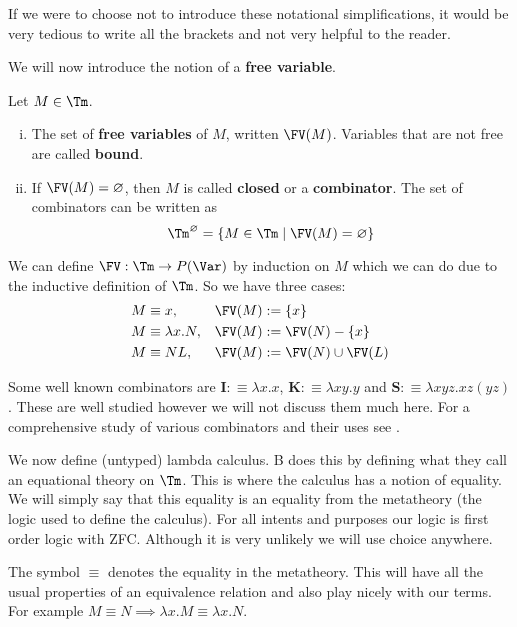 If we were to choose not to introduce these notational simplifications, it would be very tedious to write all the brackets and not very helpful to the reader.

We will now introduce the notion of a {\bf free variable}.

\begin{defin}
    Let $M \in \Tm$.
    
    \begin{enumerate}[(i)]
        \item The set of {\bf free variables} of $M$, written $\FV(M)$. Variables that are not free are called {\bf bound}.
        \item If $\FV(M) = \varnothing$, then $M$ is called {\bf closed} or a {\bf combinator}. The set of combinators can be written as $$\Tm^\varnothing = \{ M \in \Tm \mid \FV(M) = \varnothing\}$$
    \end{enumerate}
    We can define $\FV : \Tm \to P(\Var)$ by induction on $M$ which we can do due to the inductive definition of $\Tm$. So we have three cases:
    \[\begin{aligned}    
        &M \equiv x ,  &\FV(M) &:= \{x\} \\
        &M \equiv \lambda x . N,  &\FV(M)&:= \FV(N) - \{ x \} \\
        &M \equiv N L,  &\FV(M) &:= \FV(N) \cup \FV(L)
    \end{aligned}\]
\end{defin}

\begin{example}
Some well known combinators are $\mathbf{I} :\equiv \lambda x . x$, $\mathbf{K} :\equiv \lambda x y .y$ and $\mathbf{S}:\equiv \lambda x y z . xz(yz)$. These are well studied however we will not discuss them much here. For a comprehensive study of various combinators and their uses see \cite{smullyan2012mock}.
\end{example}

We now define (untyped) lambda calculus. B does this by defining what they call an equational theory on $\Tm$. This is where the calculus has a notion of equality. We will simply say that this equality is an equality from the metatheory (the logic used to define the calculus). For all intents and purposes our logic is first order logic with ZFC. Although it is very unlikely we will use choice anywhere.

\begin{defin}
    The symbol $\equiv$ denotes the equality in the metatheory. This will have all the usual properties of an equivalence relation and also play nicely with our terms. For example $M \equiv N \implies \lambda x . M \equiv \lambda x . N$.
\end{defin}

